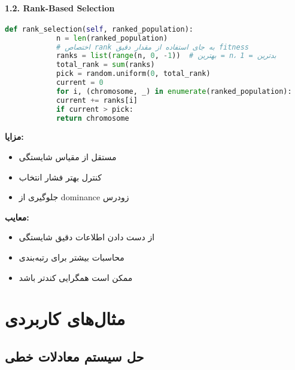 \documentclass[12pt,a4paper]{article}
\newenvironment{ltrcode}{\lr\bgroup}{\egroup}
\begin{document}
	\paragraph{1.2. Rank-Based Selection}
	
	\begin{ltrcode}
		\begin{lstlisting}[language=Python, caption=Rank-Based Selection]
			def rank_selection(self, ranked_population):
			n = len(ranked_population)
			# اختصاص rank به جای استفاده از مقدار دقیق fitness
			ranks = list(range(n, 0, -1))  # بهترین = n، بدترین = 1
			total_rank = sum(ranks)
			pick = random.uniform(0, total_rank)
			current = 0
			for i, (chromosome, _) in enumerate(ranked_population):
			current += ranks[i]
			if current > pick:
			return chromosome
		\end{lstlisting}
	\end{ltrcode}
	
	\textbf{مزایا:}
	\begin{itemize}
		\item مستقل از مقیاس شایستگی
		\item کنترل بهتر فشار انتخاب
		\item جلوگیری از dominance زودرس
	\end{itemize}
	
	\textbf{معایب:}
	\begin{itemize}
		\item از دست دادن اطلاعات دقیق شایستگی
		\item محاسبات بیشتر برای رتبه‌بندی
		\item ممکن است همگرایی کندتر باشد
	\end{itemize}
	
	\section{مثال‌های کاربردی}
	
	\subsection{حل سیستم معادلات خطی}
	
\end{document}
